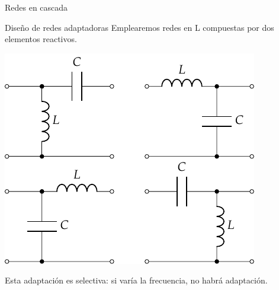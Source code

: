 \documentclass[aspectratio=169, usenames,svgnames,dvipsnames]{beamer}
\begin{document}
\begin{frame}[label={sec:orgf5e06f6}]{Redes en cascada}
\end{frame}

\begin{frame}[label={sec:org5824e36}]{Diseño de redes adaptadoras}
Emplearemos redes en L compuestas por dos elementos reactivos.

\begin{center}
\includegraphics[height=0.7\textheight]{../figs/Everitt_LC.pdf}
\end{center}

Esta adaptación es selectiva: si varía la frecuencia, no habrá adaptación.
\end{frame}
\end{document}
